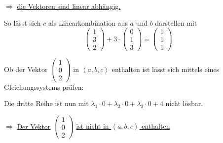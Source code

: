 \documentclass{scrreprt}
\newcommand\hull[1]{\left\langle #1 \right\rangle}
\begin{document}
\begin{enumerate}[(a)]
  $\Rightarrow$ \underline{die Vektoren sind linear abhängig.}

  So lässt sich $c$ als Linearkombination aus $a$ und $b$ darstellen mit
  \[
    \begin{pmatrix} 1 \\ 3 \\ 2 \end{pmatrix} +
    3 \cdot \begin{pmatrix} 0 \\ 1 \\ 3 \end{pmatrix}
    = \begin{pmatrix} 1 \\ 1 \\ 1 \end{pmatrix}
  \]

  \newpage
  Ob der Vektor $\begin{pmatrix} 1 \\ 0 \\ 2\end{pmatrix}$ in $\hull{a, b, c}$
  enthalten ist lässt sich mittels eines Gleichungssystems prüfen:

  Die dritte Reihe ist nun mit
  $\lambda_1 \cdot 0 + \lambda _2 \cdot 0 + \lambda_3 \cdot 0 + 4$
  nicht lösbar.

  $\Rightarrow$ \underline{Der Vektor}
  $\begin{pmatrix} 1 \\ 0 \\ 2\end{pmatrix}$
  \underline{ist nicht in $\hull{a, b, c}$ enthalten}

\end{enumerate}
\end{document}

